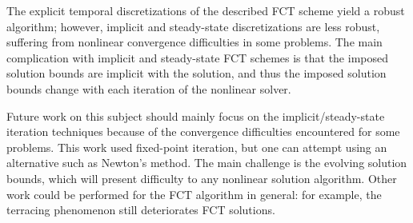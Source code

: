 The explicit temporal discretizations of the described FCT scheme yield a robust algorithm; however, implicit and steady-state discretizations
are less robust, suffering from nonlinear convergence difficulties
in some problems. %
The main complication with implicit and steady-state
FCT schemes is that the imposed solution bounds are implicit with the solution,
and thus the imposed solution bounds change with each iteration of the
nonlinear solver.

Future work on this subject should mainly focus on the implicit/steady-state
iteration techniques because of the convergence difficulties
encountered for some problems. This work used fixed-point iteration, but
one can attempt using an alternative such as Newton's method. The main
challenge is the evolving solution bounds, which will present difficulty
to any nonlinear solution algorithm. Other work could be performed for
the FCT algorithm in general: for example, the terracing phenomenon still
deteriorates FCT solutions. %
